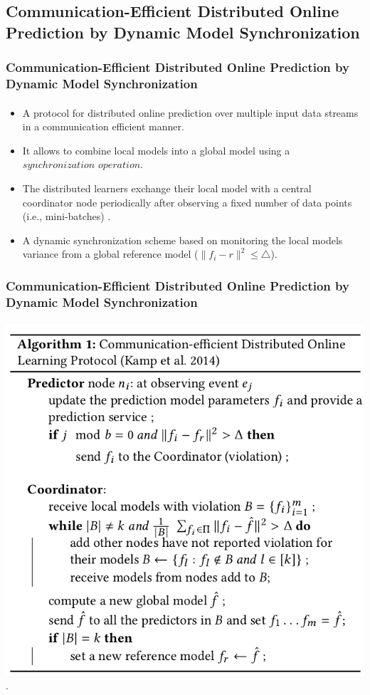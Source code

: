 \subsection{Communication-Efficient Distributed Online Prediction by Dynamic Model Synchronization}
\frame
{
	\frametitle{ Communication-Efficient Distributed Online Prediction by Dynamic Model Synchronization  }
	\framesubtitle{\citep{kamp2014communication}}
	\begin{itemize}[]
		\item<1-> A protocol for distributed online prediction over multiple input data streams in a communication efficient manner.
		\item<1-> It allows to combine local models into a global model
	using a $synchronization$ $ operation$.
		\item<1-> The distributed learners exchange their local model with a central coordinator node periodically after observing a fixed number of data points (i.e., mini-batches) \citep{dekel2012optimal}.
		
		\item<1-> A dynamic synchronization scheme based on monitoring the local models variance from a global reference model ($\|f_i - r\|^2 \leq \bigtriangleup$).
		
		
	\end{itemize}
}


\frame
{
	\frametitle{ Communication-Efficient Distributed Online Prediction by Dynamic Model Synchronization}
	\framesubtitle{}
	\begin{center}
		\includegraphics[width=\textwidth,left,height=.8\textheight]{figures/dol.png}\\
		.
	\end{center}
}

